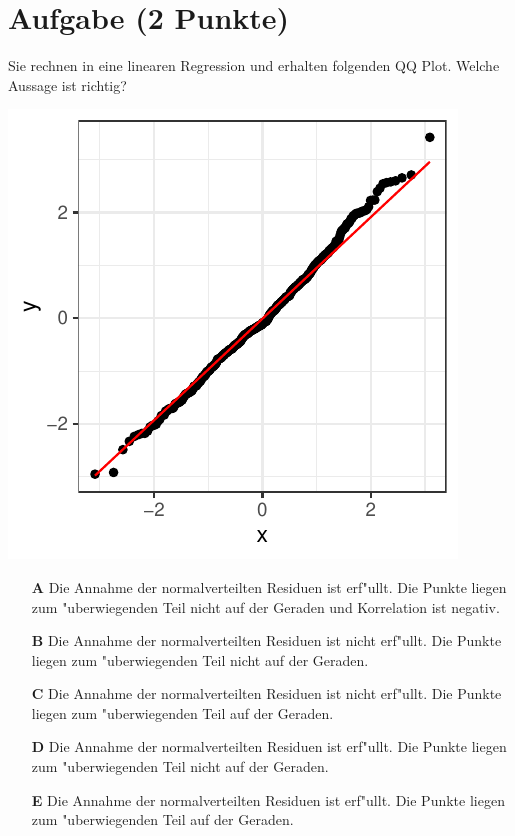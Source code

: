 \documentclass[a4paper, 10pt]{scrartcl}\usepackage[]{graphicx}\usepackage[]{xcolor}
\makeatletter
\def\maxwidth{ %
  \ifdim\Gin@nat@width>\linewidth
    \linewidth
  \else
    \Gin@nat@width
  \fi
}
\makeatother
\begin{document}
\section{Aufgabe \hfill (2 Punkte)}

Sie rechnen in eine linearen Regression und erhalten folgenden QQ
Plot. Welche Aussage ist richtig?




{\centering \includegraphics[width=\maxwidth]{img/mc-regression-05-a-1} 

}







\begin{enumerate}
\item [\textbf{A} \msquare] Die Annahme der normalverteilten Residuen ist erf{"u}llt. Die Punkte liegen zum {"u}berwiegenden Teil nicht auf der Geraden und Korrelation ist negativ.
\item [\textbf{B} \msquare] Die Annahme der normalverteilten Residuen ist nicht erf{"u}llt. Die Punkte liegen zum {"u}berwiegenden Teil nicht auf der Geraden.
\item [\textbf{C} \msquare] Die Annahme der normalverteilten Residuen ist nicht erf{"u}llt. Die Punkte liegen zum {"u}berwiegenden Teil auf der Geraden.
\item [\textbf{D} \msquare] Die Annahme der normalverteilten Residuen ist erf{"u}llt. Die Punkte liegen zum {"u}berwiegenden Teil nicht auf der Geraden.
\item [\textbf{E} \msquare] Die Annahme der normalverteilten Residuen ist erf{"u}llt. Die Punkte liegen zum {"u}berwiegenden Teil auf der Geraden.
\end{enumerate}
\end{document}
